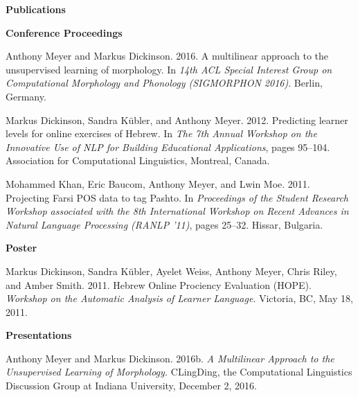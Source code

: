 \begin{singlespace}

%
\vspace{16pt}
\centerline{\large \textbf{Publications}}
\vspace{6pt} 
\centerline{\textbf{Conference Proceedings}}
\begin{description}
\item Anthony Meyer and Markus Dickinson. 2016. A multilinear approach to the unsupervised
learning of morphology. In \emph{14th ACL Special Interest Group on Computational Morphology and
Phonology (SIGMORPHON 2016)}. Berlin, Germany.
\item Markus Dickinson, Sandra K\"{u}bler, and Anthony Meyer. 2012. Predicting learner levels for online
exercises of Hebrew. In \emph{The 7th Annual Workshop on the Innovative Use of NLP for Building
Educational Applications}, pages 95--104. Association for Computational Linguistics, Montreal,
Canada.
\item Mohammed Khan, Eric Baucom, Anthony Meyer, and Lwin Moe. 2011. Projecting Farsi POS
data to tag Pashto. In \emph{Proceedings of the Student Research Workshop associated with the 8th
International Workshop on Recent Advances in Natural Language Processing (RANLP '11)},
pages 25--32. Hissar, Bulgaria.
\end{description}
\vspace{-3pt}
\centerline{\textbf{Poster}} %
\begin{description}
\item Markus Dickinson, Sandra K\"{u}bler, Ayelet Weiss, Anthony Meyer, Chris Riley, and Amber Smith.
2011. Hebrew Online Prociency Evaluation (HOPE). \emph{Workshop on the Automatic Analysis of
Learner Language}. Victoria, BC, May 18, 2011.
\end{description}
\centerline{\textbf{Presentations}}
\begin{description}
\item Anthony Meyer and Markus Dickinson. 2016b. \emph{A Multilinear Approach to the
Unsupervised Learning of Morphology.} CLingDing, the Computational Linguistics
Discussion Group at Indiana University, December 2, 2016.

\end{description}
\end{singlespace}

